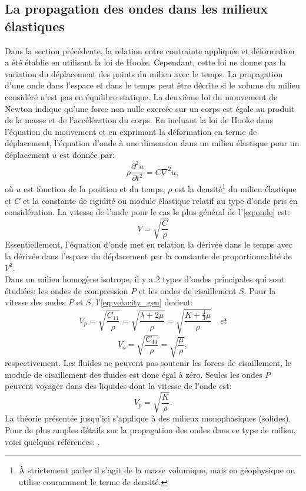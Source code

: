 \subsection*{La propagation des ondes dans les milieux élastiques}
\label{sc:prop_ondes}
Dans la section précédente, la relation entre contrainte appliquée et
déformation a été établie en utilisant la loi de Hooke. Cependant, cette loi ne
donne pas la variation du déplacement des points du milieu avec le temps. La
propagation d’une onde dans l’espace et dans le temps peut être décrite si le
volume du milieu considéré n’est pas en équilibre statique. La deuxième loi du
mouvement de Newton indique qu’une force non nulle exercée sur un corps est
égale au produit de la masse et de l’accélération du corps. En incluant la loi
de Hooke dans l’équation du mouvement et en exprimant la déformation en terme de
déplacement, l’équation d’onde à une dimension dans un milieu élastique pour un
déplacement $u$ est donnée par:
\begin{equation}
\rho\frac{\partial^2 u}{\partial t^2} = C\nabla^2u,
\label{eq:onde}
\end{equation}
où $u$ est fonction de la position et du temps, $\rho$ est la
densité\footnote{À strictement parler il s'agit de la masse volumique, mais en
géophysique on utilise couramment le terme de densité.} du milieu
élastique et $C$ et la constante de rigidité ou module élastique relatif au
type d'onde pris en considération. La vitesse de l'onde pour le cas le plus
général de l'\cref{eq:onde} est:
\begin{equation}
V = \sqrt{\frac{C}{\rho}}
\label{eq:velocity_gen}
\end{equation}
Essentiellement, l’équation d’onde met en relation la dérivée dans le temps avec
la dérivée dans l’espace du déplacement par la constante de proportionnalité de
$V^2$.\\
Dans un milieu homogène isotrope, il y a 2 types d’ondes principales qui sont
étudiées: les ondes de compression $P$ et les ondes de cisaillement $S$. Pour la
vitesse des ondes $P$ et $S$, l'\cref{eq:velocity_gen} devient:
\begin{equation}
V_p = \sqrt{\frac{C_{11}}{\rho}} = \sqrt{\frac{\lambda + 2\mu}{\rho}} =
\sqrt{\frac{K+\frac{4}{3}\mu}{\rho}}\quad et
\label{eq:vitesse_p}
\end{equation}
\begin{equation}
V_s = \sqrt{\frac{C_{44}}{\rho}} = \sqrt{\frac{\mu}{\rho}} ,
\label{eq:vitesse_s}
\end{equation}
respectivement. Les fluides ne peuvent pas soutenir les forces de cisaillement,
le module de cisaillement des fluides est donc égal à zéro. Seules les ondes
$P$ peuvent voyager dans des liquides dont la vitesse de l’onde est:
\begin{equation}
V_p = \sqrt{\frac{K}{\rho}} .
\label{eq:velocity_pliq}
\end{equation}
La théorie présentée jusqu'ici s'applique à des milieux monophasiques (solides).
Pour de plus amples détails sur la propagation des ondes dans ce type de milieu,
voici quelques références: \citet{Sheriff1995,Aki1980}.\par

